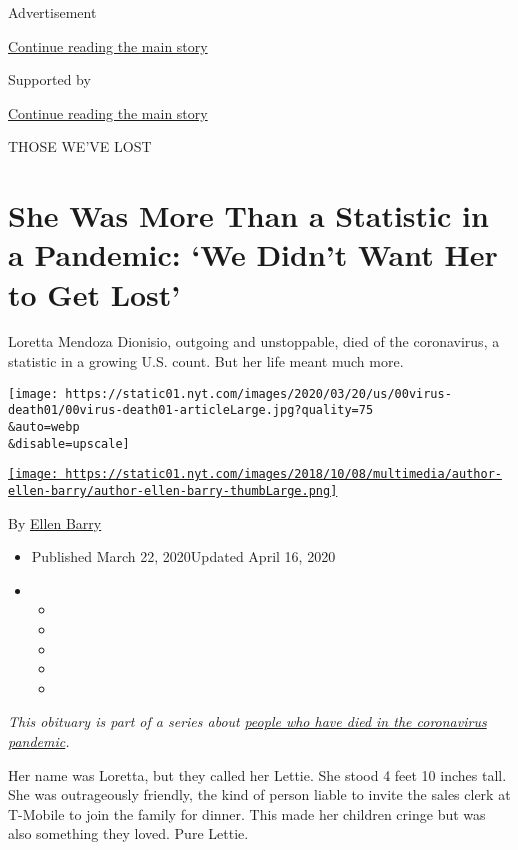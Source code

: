 Advertisement

\protect\hyperlink{after-top}{Continue reading the main story}

Supported by

\protect\hyperlink{after-sponsor}{Continue reading the main story}

THOSE WE'VE LOST

\hypertarget{she-was-more-than-a-statistic-in-a-pandemic-we-didnt-want-her-to-get-lost}{%
\section{She Was More Than a Statistic in a Pandemic: `We Didn't Want
Her to Get
Lost'}\label{she-was-more-than-a-statistic-in-a-pandemic-we-didnt-want-her-to-get-lost}}

Loretta Mendoza Dionisio, outgoing and unstoppable, died of the
coronavirus, a statistic in a growing U.S. count. But her life meant
much more.

\texttt{[image: https://static01.nyt.com/images/2020/03/20/us/00virus-death01/00virus-death01-articleLarge.jpg?quality=75\\\&auto=webp\\\&disable=upscale]}

\href{https://www.nytimes.com/by/ellen-barry}{\texttt{[image: https://static01.nyt.com/images/2018/10/08/multimedia/author-ellen-barry/author-ellen-barry-thumbLarge.png]}}

By \href{https://www.nytimes.com/by/ellen-barry}{Ellen Barry}

\begin{itemize}
\item
  Published March 22, 2020Updated April 16, 2020
\item
  \begin{itemize}
  \item
  \item
  \item
  \item
  \item
  \end{itemize}
\end{itemize}

\emph{This obituary is part of a series about}
\href{https://www.nytimes.com/series/people-who-have-died-of-the-coronavirus}{\emph{people
who have died in the coronavirus pandemic}}\emph{.}

Her name was Loretta, but they called her Lettie. She stood 4 feet 10
inches tall. She was outrageously friendly, the kind of person liable to
invite the sales clerk at T-Mobile to join the family for dinner. This
made her children cringe but was also something they loved. Pure Lettie.

